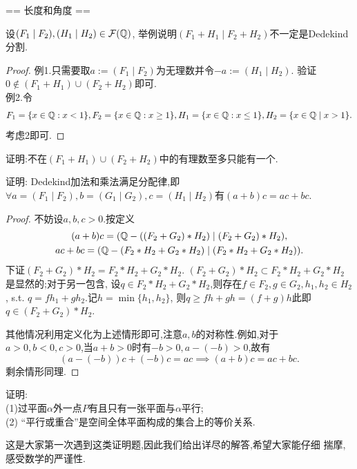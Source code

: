 == 长度和角度 ==
\begin{exercise}
    设$(F_1\mid F_2),(H_1\mid H_2)\in\mathcal{F}(\mathbb{Q})$,
    举例说明$(F_1+H_1\mid F_2+H_2)$不一定是Dedekind分割.
\end{exercise}
\begin{proof}
    例1.只需要取$a:=(F_1\mid F_2)$为无理数并令$-a:=(H_1\mid H_2)$.
    验证$0\not\in(F_1+H_1)\cup(F_2+H_2)$即可.\\
    例2.令\[F_1=\{x\in\mathbb{Q}:x<1\}, F_2=\{x\in\mathbb{Q}:x\geq1\}, H_1=
    \{x\in\mathbb{Q}:x\leq1\}, H_2=\{x\in\mathbb{Q}\mid x>1\}.\]考虑2即可.
\end{proof}
\begin{practice}
    证明:不在$(F_1+H_1)\cup(F_2+H_2)$中的有理数至多只能有一个.
\end{practice}
\begin{exercise}
    证明: Dedekind加法和乘法满足分配律,即$\forall a=(F_1\mid F_2),
    b=(G_1\mid G_2),c=(H_1\mid H_2)$有$(a+b)c=ac+bc$.
\end{exercise}
\begin{proof}
    不妨设$a,b,c>0$.按定义\[\begin{gathered}
    (a+b)c=(\mathbb{Q}-((F_2+G_2)*H_2)\mid(F_2+G_2)*H_2),\\
    ac+bc=(\mathbb{Q}-(F_2*H_2+G_2*H_2)\mid(F_2*H_2+G_2*H_2)).
    \end{gathered}\]下证$(F_2+G_2)*H_2=F_2*H_2+G_2*H_2$.
    $(F_2+G_2)*H_2\subset F_2*H_2+G_2*H_2$是显然的;对于另一包含,
    设$q\in F_2*H_2+G_2*H_2$,则存在$f\in F_2,g\in G_2,
    h_1,h_2\in H_2$, s.t. $q=fh_1+gh_2$.记$h=\min\{h_1,h_2\}$,
    则$q\geq fh+gh=(f+g)h$此即$q\in(F_2+G_2)*H_2$.

    其他情况利用定义化为上述情形即可,注意$a,b$的对称性.例如,对于
    $a>0,b<0,c>0$,当$a+b>0$时有$-b>0,a-(-b)>0$,故有
    \[(a-(-b))c+(-b)c=ac\implies(a+b)c=ac+bc.\]剩余情形同理.
\end{proof}
\begin{exercise}
    证明:\\
    (1)过平面$\alpha$外一点$P$有且只有一张平面与$\alpha$平行;\\
    (2) “平行或重合”是空间全体平面构成的集合上的等价关系.
\end{exercise}
\begin{remark}
    这是大家第一次遇到这类证明题,因此我们给出详尽的解答,希望大家能仔细
    揣摩,感受数学的严谨性.
\end{remark}

